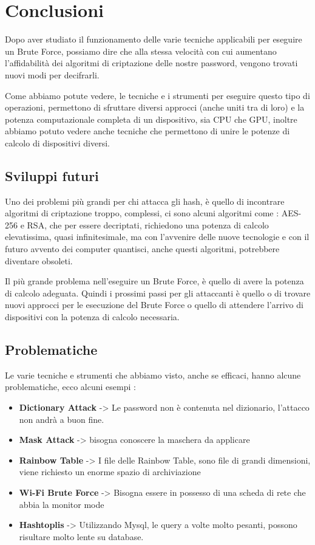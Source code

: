 \chapter{Conclusioni}

Dopo aver studiato il funzionamento delle varie tecniche applicabili per eseguire un Brute Force, possiamo dire che alla stessa velocità con cui aumentano l'affidabilità dei algoritmi di criptazione delle nostre password, vengono trovati nuovi modi per decifrarli.

Come abbiamo potute vedere, le tecniche e i strumenti per eseguire questo tipo di operazioni, permettono di sfruttare diversi approcci (anche uniti tra di loro) e la potenza computazionale completa di un dispositivo, sia CPU che GPU, inoltre abbiamo potuto vedere anche tecniche che permettono di unire le potenze di calcolo di dispositivi diversi.

\section{Sviluppi futuri}

Uno dei problemi più grandi per chi attacca gli hash, è quello di incontrare algoritmi di criptazione troppo, complessi, ci sono alcuni algoritmi come : AES-256 e RSA, che per essere decriptati, richiedono una potenza di calcolo elevatissima, quasi infinitesimale, ma con l'avvenire delle nuove tecnologie e con il futuro avvento dei computer quantisci, anche questi algoritmi, potrebbere diventare obsoleti.

Il più grande problema nell'eseguire un Brute Force, è quello di avere la potenza di calcolo adeguata. Quindi i prossimi passi per gli attaccanti è quello o di trovare nuovi approcci per le esecuzione del Brute Force o quello di attendere l'arrivo di dispositivi con la potenza di calcolo necessaria.

\section{Problematiche}

Le varie tecniche e strumenti che abbiamo visto, anche se efficaci, hanno alcune problematiche, ecco alcuni esempi :

\begin{itemize}
    \item \textbf{Dictionary Attack} -> Le password non è contenuta nel dizionario, l'attacco non andrà a buon fine.
    \item \textbf{Mask Attack} -> bisogna conoscere la maschera da applicare
    \item \textbf{Rainbow Table } -> I file delle Rainbow Table, sono file di grandi dimensioni, viene richiesto un enorme spazio di archiviazione
    \item \textbf{Wi-Fi Brute Force} -> Bisogna essere in possesso di una scheda di rete che abbia la monitor mode
    \item \textbf{Hashtoplis } -> Utilizzando Mysql, le query a volte molto pesanti, possono risultare molto lente su database.
\end{itemize}

